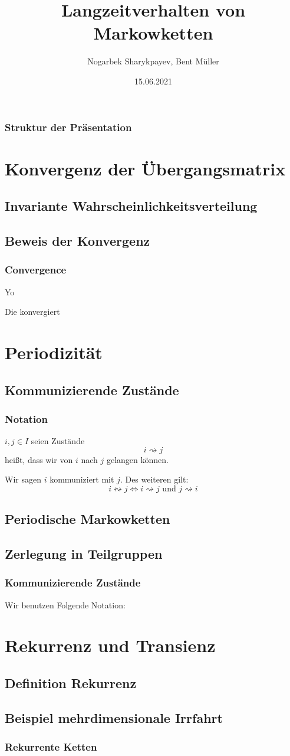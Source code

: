 \documentclass[]{beamer}
\title{Langzeitverhalten von Markowketten}
\author{Nogarbek Sharykpayev, Bent Müller}
\institute{Universität Hamburg}
\date{15.06.2021}
\begin{document}
\frame{\titlepage}
	\begin{frame}
		\frametitle{Struktur der Präsentation}
		\tableofcontents
	\end{frame}

	\section{Konvergenz der Übergangsmatrix}
	\subsection{Invariante Wahrscheinlichkeitsverteilung}
	\subsection{Beweis der Konvergenz}

	\begin{frame}
		\frametitle{Convergence}
		Yo
	\end{frame}
	\begin{frame}
		Die konvergiert
	\end{frame}

	\section{Periodizität}
	\subsection{Kommunizierende Zustände}
	\begin{frame}
		\frametitle{Notation}
		$i, j \in I$ seien Zustände
		\[
			i \rightsquigarrow j
		\]
		heißt, dass wir von $i$ nach $j$ gelangen können.

		Wir sagen $i$ kommuniziert mit $j$.
		Des weiteren gilt:
		\[
		i \leftrightsquigarrow j \Leftrightarrow i \rightsquigarrow j
		\text{ und } j \rightsquigarrow i
		\] 
	\end{frame}
	
	\subsection{Periodische Markowketten}
	\subsection{Zerlegung in Teilgruppen}
	\begin{frame}
		\frametitle{Kommunizierende Zustände}
		Wir benutzen Folgende Notation:
	\end{frame}

	\section{Rekurrenz und Transienz}
	\subsection{Definition Rekurrenz}
	\subsection{Beispiel mehrdimensionale Irrfahrt}
	\begin{frame}
		\frametitle{Rekurrente Ketten}
		
	\end{frame}
	
\end{document}
